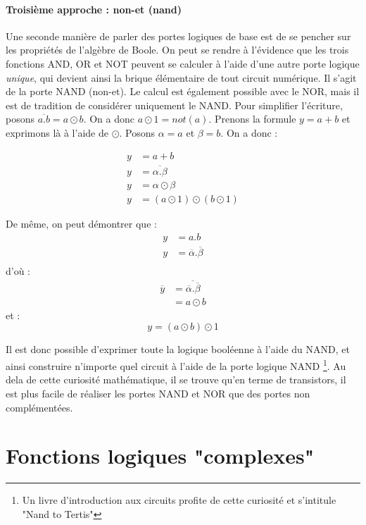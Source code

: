\paragraph{Troisième approche : non-et (nand)}

Une seconde manière de parler des portes logiques de base est de se pencher sur les propriétés de l'algèbre de Boole. On peut se rendre à l'évidence que les trois fonctions AND, OR et NOT
peuvent se calculer à l'aide d'une autre porte logique {\it unique}, qui devient ainsi la brique élémentaire de tout circuit numérique. Il s'agit de la porte NAND (non-et). Le calcul est également
possible avec le NOR, mais il est de tradition de considérer uniquement le NAND. Pour simplifier l'écriture, posons $\overline{a.b}=a \odot b$. On a donc $a \odot 1=not(a)$.
Prenons la formule $y=a+b$ et exprimons là à l'aide de $\odot$. Posons $\alpha=a$ et $\beta=b$.  On a donc :

\begin{align}
y &=  a + b \\
y  &= \overline{\alpha.\beta}\\
y  &= \alpha \odot \beta\\
y &= (a \odot 1) \odot (b \odot 1)
\end{align}

De même, on peut démontrer que :
\begin{align}
y &=  a.b \\
y  &= \overline{\alpha}.\overline{\beta}\\
\end{align}
d'où :
\begin{align}
\overline{y}  &=  \overline{\overline{\alpha}.\overline{\beta}}\\
  &=  a \odot b
\end{align}
et : $$y=(a \odot b) \odot 1$$

Il est donc possible d'exprimer toute la logique booléenne à l'aide du NAND, et ainsi construire n'importe quel circuit à l'aide de la porte logique NAND \footnote{Un livre d'introduction aux circuits profite de cette curiosité et s'intitule "Nand to Tertis"}.
Au dela de cette curiosité mathématique, il se trouve qu'en terme de transistors, il est plus facile de réaliser les portes NAND et NOR que des portes non complémentées.

\section{Fonctions logiques "complexes"}

